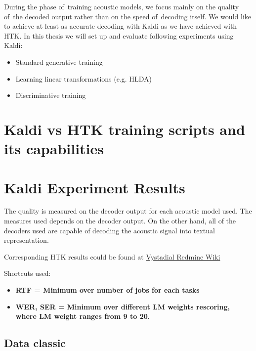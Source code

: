 During the phase of~training acoustic models, we focus mainly on the quality 
of~the decoded output rather than on the speed of~decoding itself. 
We would like to achieve at least as accurate decoding with Kaldi as we have 
achieved with \ac{HTK}. In this thesis we will set up and evaluate following 
experiments using Kaldi:
\begin{itemize}
    \item Standard generative training
    \item Learning linear transformations (e.g. \ac{HLDA})
    \item Discriminative training 
\end{itemize}


\section[Kaldi vs \ac{HTK}]{Kaldi vs \ac{HTK} training scripts and its capabilities} 
\label{sec:kaldi_htk}


\section{Kaldi Experiment Results} %
\label{sec:exp_results}

The quality is measured on the decoder output for each acoustic model used. 
The measures used depends on the decoder output. 
On the other hand, all of the decoders used are capable of decoding 
the acoustic signal into textual representation. 

Corresponding \ac{HTK} results could be found at
\href{https://redmine.ms.mff.cuni.cz/projects/vystadial/wiki/Acoustic_models/}{Vystadial Redmine Wiki}

Shortcuts used:
\begin{itemize}
    \item \bf \ac{RTF} = Minimum over number of jobs for each tasks
    \item \bf \ac{WER}, \ac{SER} = Minimum over different LM weights rescoring,
        where LM weight ranges from 9 to 20. 
\end{itemize}

\subsection*{Data classic}

